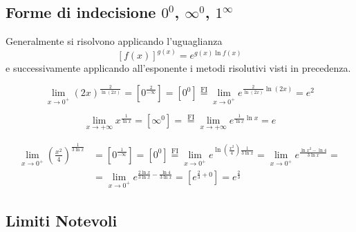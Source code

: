 \documentclass{book}     %
\begin{document}
\subsection{Forme di indecisione $0^0$, $\infty^0$, $1^\infty$}
Generalmente si risolvono applicando l'uguaglianza \[\left[f(x)\right]^{g(x)}=e^{g(x)\ln f(x)}\]
e successivamente applicando all'esponente i metodi risolutivi visti in precedenza.
\begin{ex}
\[\lim_{x\to0^+}(2x)^{\frac{2}{\ln(2x)}}=\left[0^\frac{2}{-\infty}\right]=\left[0^0\right]\overset{\mathrm{FI}}{=}\lim_{x\to0^+}e^{\frac{2}{\ln(2x)}\ln(2x)}=e^2\]
\end{ex}
\begin{ex}
\[\lim_{x\to+\infty}x^\frac{1}{\ln x}=\left[\infty^0\right]=\overset{\mathrm{FI}}{=}\lim_{x\to+\infty}e^{\frac{1}{\ln x}\ln x}=e\]
\end{ex}
\begin{ex}
\[\begin{aligned}\lim_{x\to 0^+}\left(\frac{x^2}{4}\right)^\frac{1}{3\ln x}&=\left[0^\frac{1}{-\infty}\right]=\left[0^0\right]\overset{\mathrm{FI}}{=}\lim_{x\to0^+}e^{\ln\left(\frac{x^2}{4}\right)\frac{1}{3\ln x}}=\lim_{x\to0^+}e^{\frac{\ln x^2-\ln4}{3\ln x}} =\\&=\lim_{x\to0^+}e^{\frac{2\ln x}{3\ln x}-\frac{\ln4}{3\ln x}}=\left[e^{\frac{2}{3}+0}\right]=e^\frac{2}{3}\end{aligned}\]
\end{ex}
\subsection{Limiti Notevoli}
\end{document}

